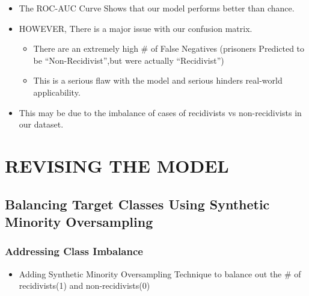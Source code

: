 \documentclass[11pt]{article}
\providecommand{\tightlist}{%
      \setlength{\itemsep}{0pt}\setlength{\parskip}{0pt}}
\begin{document}
\begin{itemize}
\tightlist
\item
  The ROC-AUC Curve Shows that our model performs better than chance.
\item
  HOWEVER, There is a major issue with our confusion matrix.

  \begin{itemize}
  \tightlist
  \item
    There are an extremely high \# of False Negatives (prisoners
    Predicted to be ``Non-Recidivist'',but were actually ``Recidivist'')
  \item
    This is a serious flaw with the model and serious hinders real-world
    applicability.
  \end{itemize}
\item
  This may be due to the imbalance of cases of recidivists vs
  non-recidivists in our dataset.
\end{itemize}

    \hypertarget{revising-the-model}{%
\section{REVISING THE MODEL}\label{revising-the-model}}

\hypertarget{balancing-target-classes-using-synthetic-minority-oversampling}{%
\subsection{Balancing Target Classes Using Synthetic Minority
Oversampling}\label{balancing-target-classes-using-synthetic-minority-oversampling}}

    \hypertarget{addressing-class-imbalance}{%
\subsubsection{Addressing Class
Imbalance}\label{addressing-class-imbalance}}

\begin{itemize}
\tightlist
\item
  Adding Synthetic Minority Oversampling Technique to balance out the \#
  of recidivists(1) and non-recidivists(0)
\end{itemize}
\end{document}
